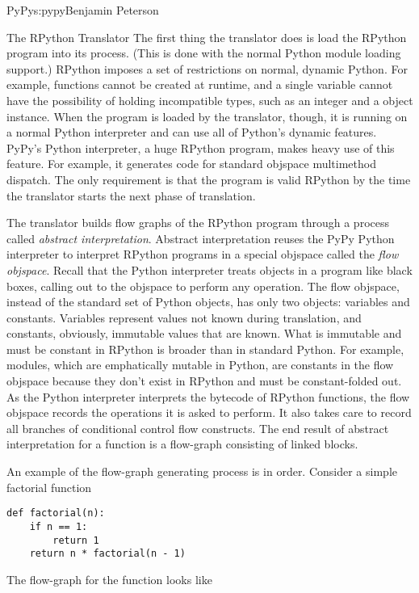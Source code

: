 \begin{aosachapter}{PyPy}{s:pypy}{Benjamin Peterson}
\begin{aosasect1}{The RPython Translator}
The first thing the translator does is load the RPython program into its
process. (This is done with the normal Python module loading support.) RPython
imposes a set of restrictions on normal, dynamic Python. For example, functions
cannot be created at runtime, and a single variable cannot have the possibility
of holding incompatible types, such as an integer and a object instance. When
the program is loaded by the translator, though, it is running on a normal
Python interpreter and can use all of Python's dynamic features. PyPy's Python
interpreter, a huge RPython program, makes heavy use of this feature. For
example, it generates code for standard objspace multimethod dispatch. The only
requirement is that the program is valid RPython by the time the translator
starts the next phase of translation.

The translator builds flow graphs of the RPython program through a process
called \emph{abstract interpretation}. Abstract interpretation reuses the PyPy
Python interpreter to interpret RPython programs in a special objspace called
the \emph{flow objspace}. Recall that the Python interpreter treats objects in a
program like black boxes, calling out to the objspace to perform any
operation. The flow objspace, instead of the standard set of Python objects, has
only two objects: variables and constants. Variables represent values not known
during translation, and constants, obviously, immutable values that are
known. What is immutable and must be constant in RPython is broader than in
standard Python. For example, modules, which are emphatically mutable in Python,
are constants in the flow objspace because they don't exist in RPython and must
be constant-folded out. As the Python interpreter interprets the bytecode of
RPython functions, the flow objspace records the operations it is asked to
perform. It also takes care to record all branches of conditional control flow
constructs. The end result of abstract interpretation for a function is a
flow-graph consisting of linked blocks.

An example of the flow-graph generating process is in order. Consider a simple
factorial function

\begin{verbatim}
def factorial(n):
    if n == 1:
        return 1
    return n * factorial(n - 1)
\end{verbatim}

The flow-graph for the function looks like 



\end{aosasect1}
\end{aosachapter}
